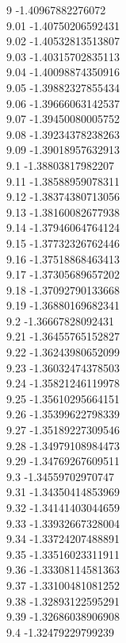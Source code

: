 {9	-1.40967882276072\\
9.01	-1.40750206592431\\
9.02	-1.40532813513807\\
9.03	-1.40315702835113\\
9.04	-1.40098874350916\\
9.05	-1.39882327855434\\
9.06	-1.39666063142537\\
9.07	-1.39450080005752\\
9.08	-1.39234378238263\\
9.09	-1.39018957632913\\
9.1	-1.38803817982207\\
9.11	-1.38588959078311\\
9.12	-1.38374380713056\\
9.13	-1.38160082677938\\
9.14	-1.37946064764124\\
9.15	-1.37732326762446\\
9.16	-1.37518868463413\\
9.17	-1.37305689657202\\
9.18	-1.37092790133668\\
9.19	-1.36880169682341\\
9.2	-1.36667828092431\\
9.21	-1.36455765152827\\
9.22	-1.36243980652099\\
9.23	-1.36032474378503\\
9.24	-1.35821246119978\\
9.25	-1.35610295664151\\
9.26	-1.35399622798339\\
9.27	-1.35189227309546\\
9.28	-1.34979108984473\\
9.29	-1.34769267609511\\
9.3	-1.34559702970747\\
9.31	-1.34350414853969\\
9.32	-1.34141403044659\\
9.33	-1.33932667328004\\
9.34	-1.33724207488891\\
9.35	-1.33516023311911\\
9.36	-1.33308114581363\\
9.37	-1.33100481081252\\
9.38	-1.32893122595291\\
9.39	-1.32686038906908\\
9.4	-1.32479229799239\\
}
